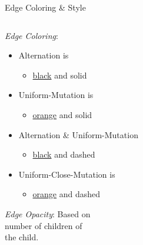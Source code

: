 \documentclass{beamer}
\begin{document}
\begin{frame}{Edge Coloring \& Style}
	\begin{columns}
		\begin{column}{.55\textwidth}
		\begin{overprint}
				\hspace{.5cm} \textit{Edge Coloring}:  \vspace{.5em}
				\begin{itemize}
				\setlength\itemsep{1em}
					\item Alternation is 
                    \begin{itemize}
	                    \item \underline{black} and solid
                    \end{itemize}
					\item Uniform-Mutation is
                    \begin{itemize}
	                    \item \underline{\color{orange} orange} and solid
                    \end{itemize}
					\item Alternation \& Uniform-Mutation
                    \begin{itemize}
	                    \item \underline{black} and dashed
                    \end{itemize}
					\item Uniform-Close-Mutation is
                    \begin{itemize}
	                    \item \underline{\color{orange} orange} and dashed
                    \end{itemize}
				\end{itemize} 
				\hspace{.5cm} \textit{Edge Opacity}: Based on \\ \vspace{.00cm}
                \hspace{0.75cm} number of children of \\ \vspace{.00cm}
                \hspace{0.75cm}  the child. \vspace{.5em}
				\begin{itemize}

\end{itemize}
\end{overprint}
\end{column}
\end{columns}
\end{frame}
\end{document}
